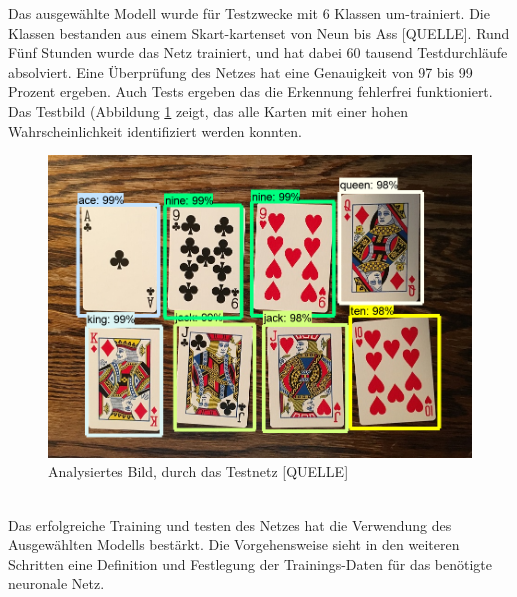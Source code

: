 \documentclass[a4paper,12pt,oneside]{article}
\begin{document}
Das ausgewählte Modell wurde für Testzwecke mit 6 Klassen um-trainiert. Die Klassen bestanden aus einem Skart-kartenset von Neun bis Ass [QUELLE]. Rund Fünf Stunden wurde das Netz trainiert, und hat dabei 60 tausend Testdurchläufe absolviert. Eine Überprüfung des Netzes hat eine Genauigkeit von 97 bis 99 Prozent ergeben. Auch Tests ergeben das die Erkennung fehlerfrei funktioniert. Das Testbild (Abbildung \ref{img:Kartenset} zeigt, das alle Karten mit einer hohen Wahrscheinlichkeit identifiziert werden konnten.
\\
\begin{figure}
    [h]
	\centering
	\includegraphics[scale=0.5]{Sources/kartenset.png}
	\caption{Analysiertes Bild, durch das Testnetz [QUELLE]}
	\label{img:Kartenset}
\end{figure}
\\
Das erfolgreiche Training und testen des Netzes hat die Verwendung des Ausgewählten Modells bestärkt. Die Vorgehensweise sieht in den weiteren Schritten eine Definition und Festlegung der Trainings-Daten für das benötigte neuronale Netz. 

\newpage
  
\end{document}

